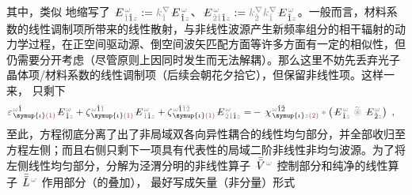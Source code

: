 其中，类似  地缩写了 $\Xint{\mathcolor{gray}{-}}{25}{E}^{\;\!\mathcolor{gray}{\omega}}_{\;\! \mathcolor{gray}{\check{1}} \hat{1} \mathcolor{gray}{z}} := \mathcolor{gray}{k^\nabla_{\check{1}}} \Xint{\mathcolor{gray}{-}}{25}{E}^{\;\!\mathcolor{gray}{\omega}}_{\;\! \hat{1} \mathcolor{gray}{z}}$、$\Xint{\mathcolor{gray}{-}}{25}{E}^{\;\!\mathcolor{gray}{\omega}}_{\;\! \mathcolor{gray}{\check{2} \check{1}} \hat{1} \mathcolor{gray}{z}} := \mathcolor{gray}{k^\nabla_{\check{2}}} \mathcolor{gray}{k^\nabla_{\check{1}}} \Xint{\mathcolor{gray}{-}}{25}{E}^{\;\!\mathcolor{gray}{\omega}}_{\;\! \hat{1} \mathcolor{gray}{z}}$。一般而言，材料系数的线性调制项所带来的线性散射，与非线性波源产生新频率组分的相干辐射的动力学过程，在正空间驱动源、倒空间波矢匹配方面等许多方面有一定的相似性\cite{gerkeAperiodicVolumeOptics2010,chenQuasiphasematchingdivisionMultiplexingHolography2021b}，但仍需要分开考虑（尽管原则上因同时发生而无法解耦）。那么这里不妨先丢弃光子晶体项/材料系数的线性调制项（后续会朝花夕拾它），但保留非线性项。这样一来， 只剩下
\begin{align} \label{eq:nonlinear(2)-wave_wkrho-simplify5}
	\varepsilon^{\;\! \mathcolor{gray}{\omega} \hat{1}}_{\;\! \symup{\iota} \textcolor{Maroon}{(1)}} \Xint{\mathcolor{gray}{-}}{295}{E}^{\;\!\mathcolor{gray}{\omega}}_{\;\! \hat{1} \mathcolor{gray}{z}} + \zeta^{\;\! \mathcolor{gray}{\omega} \hat{1} \mathcolor{gray}{\check{1}}}_{\;\! \symup{\iota} \textcolor{Maroon}{(1)}} \Xint{\mathcolor{gray}{-}}{295}{E}^{\;\!\mathcolor{gray}{\omega}}_{\;\! \mathcolor{gray}{\check{1}} \hat{1} \mathcolor{gray}{z}} + \zeta^{\;\! \mathcolor{gray}{\omega} \hat{1} \mathcolor{gray}{\check{1} \check{2}}}_{\;\! \symup{\iota} \textcolor{Maroon}{(1)}} \Xint{\mathcolor{gray}{-}}{295}{E}^{\;\!\mathcolor{gray}{\omega}}_{\;\! \mathcolor{gray}{\check{2} \check{1}} \hat{1} \mathcolor{gray}{z}}
	= &- \Xint{{}^{}_{\mathcolor{gray}{-}}}{23}{\chi}^{\;\! \mathcolor{gray}{\omega} \hat{1} \hat{2}}_{\;\! \symup{\iota} \mathcolor{gray}{z} \textcolor{Maroon}{(2)}} \mathcolor{gray}{*} \left( \Xint{\mathcolor{gray}{-}}{295}{E}^{\;\!\mathcolor{gray}{\omega}}_{\;\! \hat{1} \mathcolor{gray}{z}} ~\mathcolor{gray}{\widetilde \circledast}~ \Xint{\mathcolor{gray}{-}}{295}{E}^{\;\!\mathcolor{gray}{\omega}}_{\;\! \hat{2} \mathcolor{gray}{z}} \right) ~,
\end{align}
至此，方程彻底分离了出了非局域双各向异性耦合的线性均匀部分，并全部收归至方程左侧；而且右侧只剩下一项具有代表性的局域二阶非线性非均匀波源。为了将左侧线性均匀部分，分解为泾渭分明的非线性算子 $\Xint{\mathcolor{gray}{-}}{21}{\bar{\bar{V}}}^{\;\! \mathcolor{gray}{\omega}}$ 控制部分和纯净的线性算子 $\Xint{\mathcolor{gray}{-}}{30}{\bar{\bar{L}}}^{\;\! \mathcolor{gray}{\omega}}$ 作用部分（的叠加）， 最好写成矢量（非分量）形式

